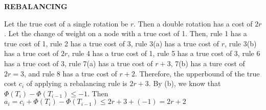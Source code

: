 \documentclass[10pt]{article}
\begin{document}
\begin{enumerate}
\begin{enumerate}
				\textbf{REBALANCING}
				\begin{addmargin}
				Let the true cost of a single rotation be $r$.
				Then a double rotation has a cost of $2r$.
				Let the change of weight on a node with a true cost of 1.
				Then, rule 1 has a true cost of 1, rule 2 has a true cost of 3, rule 3(a) has a true cost of $r$, rule 3(b) has a true cost of $2r$, 
				rule 4 has a true cost of 1, rule 5 has a true cost of 3, rule 6 has a true cost of 3, rule 7(a) has a true cost of $r+3$, 7(b) has a ture cost of $2r=3$,
				and rule 8 has a true cost of $r+2$.
				Therefore, the upperbound of the true cost $c_i$ of applying a rebalancing rule  is $2r+3$.
				By (b), we know that $\Phi(T_i) - \Phi(T_{i-1}) \leq -1$.
				Then $a_i = c_i + \Phi(T_i) - \Phi(T_{i-1}) \leq 2r+3 + (-1) = 2r+2$
				\end{addmargin}
		\end{enumerate}
\end{enumerate}
\end{document}

